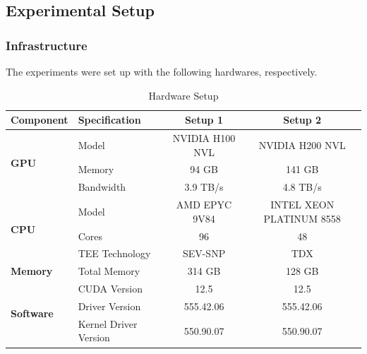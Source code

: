 \documentclass{article}
\begin{document}
\subsection{Experimental Setup}

\subsubsection{Infrastructure}

The experiments were set up with the following hardwares, respectively.

\begin{table}[htbp]
    \centering
    \begin{tabular}{llcc}
        \toprule
        \textbf{Component}                 & \textbf{Specification} & \textbf{Setup 1} & \textbf{Setup 2}         \\
        \midrule
        \multirow{3}{*}{\textbf{GPU}}      & Model                  & NVIDIA H100 NVL  & NVIDIA H200 NVL          \\
                                           & Memory                 & 94 GB            & 141 GB                   \\
                                           & Bandwidth              & 3.9 TB/s         & 4.8 TB/s                 \\
        \midrule
        \multirow{3}{*}{\textbf{CPU}}      & Model                  & AMD EPYC 9V84    & INTEL XEON PLATINUM 8558 \\
                                           & Cores                  & 96               & 48                       \\
                                           & TEE Technology         & SEV-SNP          & TDX                      \\
        \midrule
        \textbf{Memory}                    & Total Memory           & 314 GB           & 128 GB                   \\
        \midrule
        \multirow{3}{*}{\textbf{Software}} & CUDA Version           & 12.5             & 12.5                     \\
                                           & Driver Version         & 555.42.06        & 555.42.06                \\
                                           & Kernel Driver Version  & 550.90.07        & 550.90.07                \\
        \bottomrule
    \end{tabular}
    \caption{Hardware Setup}
    \label{tab:hardware_setup}
\end{table}
\end{document}
